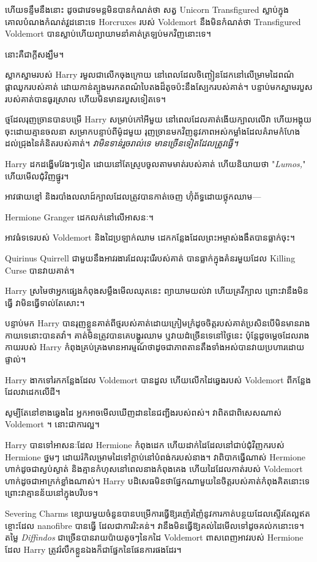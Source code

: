 {ហើយទន្ទឹមនឹងនោះ ដូចជាវេទមន្តមិនបានកំណត់ថា សត្វ Unicorn Transfigured ស្លាប់ក្នុងគោលបំណងកំណត់វួដនោះទេ Horcruxes របស់ Voldemort នឹងមិនកំណត់ថា Transfigured Voldemort បានស្លាប់ហើយព្យាយាមនាំគាត់ត្រឡប់មកវិញនោះទេ។

នោះគឺជាក្តីសង្ឃឹម។

ស្លាកស្នាមរបស់ Harry រមួលជាលើកចុងក្រោយ នៅពេលដែលចិញ្ចៀនដែកនៅលើម្រាមដៃពណ៌ផ្កាឈូករបស់គាត់ ដោយកាន់ត្បូងមរកតពណ៌បៃតងដ៏តូចប៉ះនឹងស្បែករបស់គាត់។ បន្ទាប់​មក​ស្នាម​របួស​របស់​គាត់​បាន​ធូរស្រាល ហើយ​មិន​មាន​របួស​ទៀត​ទេ។

ថ្មដែលរុញច្រានបានបម្រើ Harry សម្រាប់កៅអីមួយ នៅពេលដែលគាត់ងើយក្បាលលើវា ហើយអង្គុយចុះដោយគ្មានចលនា សម្រាកបន្ទាប់ពីម៉ូដមួយ រុញច្រានមកវិញនូវភាពអស់កម្លាំងដែលគំរាមកំហែងដល់ជ្រុងនៃគំនិតរបស់គាត់។ \emph{វាមិនទាន់រួចរាល់ទេ មានច្រើនទៀតដែលត្រូវធ្វើ។}

Harry ដកដង្ហើមវែងៗទៀត ដោយនៅតែស្រូបចូលតាមមាត់របស់គាត់ ហើយនិយាយថា "\emph{Lumos,}" ហើយមើលជុំវិញផ្នូរ។

អាវផាយខ្មៅ និងរបាំងលលាដ៍ក្បាលដែលត្រូវបានកាត់ចេញ ហ៊ុំព័ទ្ធដោយថ្លុកឈាម—

Hermione Granger ដេកលក់នៅលើអាសនៈ។

អាវធំទទេរបស់ Voldemort និងដៃប្រឡាក់ឈាម ដេកកន្លែងដែលព្រះអម្ចាស់ងងឹតបានធ្លាក់ចុះ។

Quirinus Quirrell ជាមួយនឹងអាវរងារដែលរុះរើរបស់គាត់ បានធ្លាក់ក្នុងគំនរមួយដែល Killing Curse បានវាយគាត់។

Harry ស្រមៃថាអ្នកផ្សេងកំពុងសម្លឹងមើលឈុតនេះ ព្យាយាមយល់វា ហើយគ្រវីក្បាល ព្រោះវានឹងមិនធ្វើ វាមិនធ្វើទាល់តែសោះ។

បន្ទាប់មក Harry បានរុញខ្លួនគាត់ពីថ្មរបស់គាត់ដោយក្រៀមក្រំដូចចិត្តរបស់គាត់ប្រសិនបើមិនមានរាងកាយទេនោះបានតវ៉ា។ គាត់មិនត្រូវបានគេបង្ហូរឈាម ឬវាយដំច្រើនទេនៅថ្ងៃនេះ ប៉ុន្តែដូចម្ដេចដែលរាងកាយរបស់ Harry កំពុងគ្រប់គ្រងមានអារម្មណ៍ថាដូចជាភាពតានតឹងទាំងអស់បានវាយប្រហារដោយផ្ទាល់។

Harry ងាកទៅរកកន្លែងដែល Voldemort បានដួល ហើយលើកដៃឆ្វេងរបស់ Voldemort ពីកន្លែងដែលវាដេកលើដី។

សូម្បីតែនៅខាងឆ្វេងដៃ អ្នកអាចមើលឃើញដាននៃជញ្ជីងរបស់ពស់។ វាពិតជាពិសេសណាស់ Voldemort ។ នោះជាការល្អ។

Harry បានទៅអាសនៈដែល Hermione កំពុងដេក ហើយដាក់ដៃដែលនៅជាប់ជុំវិញករបស់ Hermione ថ្នមៗ ដោយរំកិលម្រាមដៃទៅក្ដាប់នៅបំពង់ករបស់នាង។ វាពិបាកធ្វើណាស់ Hermione ហាក់ដូចជាស្ងប់ស្ងាត់ និងគ្មានកំហុសនៅពេលនាងកំពុងគេង ហើយដៃដែលកាត់របស់ Voldemort ហាក់ដូចជាអាក្រក់ខ្លាំងណាស់។ Harry បដិសេធមិនថាផ្នែកណាមួយនៃចិត្តរបស់គាត់កំពុងគិតនោះទេ ព្រោះវាគ្មានន័យនៅក្នុងបរិបទ។

Severing Charms ខ្សោយមួយចំនួនបានបម្រើការធ្វើឱ្យរញ៉េរញ៉ៃនូវការកាត់បន្ថយដែលស្ទើរតែល្អឥតខ្ចោះដែល nanofibre បានធ្វើ ដែលជាការរិះគន់។ វា​នឹង​មិន​ធ្វើ​ឱ្យ​គល់​ដៃ​មើល​ទៅ​ដូច​គល់​ក​នោះ​ទេ។ តម្លៃ \emph{Diffindos} ជាច្រើនបានរាយប៉ាយតូចៗនៃកដៃ Voldemort ពាសពេញអាវរបស់ Hermione ដែល Harry ត្រូវរំលឹកខ្លួនឯងក៏ជាផ្នែកនៃផែនការផងដែរ។

}
